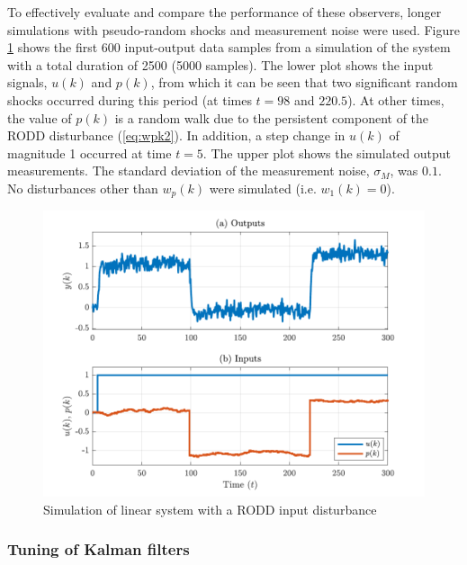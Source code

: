 To effectively evaluate and compare the performance of these observers, longer simulations with pseudo-random shocks and measurement noise were used. Figure \ref{fig:rod-obs-sim1-ioplot} shows the first 600 input-output data samples from a simulation of the system with a total duration of 2500 (5000 samples). The lower plot shows the input signals, $u(k)$ and $p(k)$, from which it can be seen that two significant random shocks occurred during this period (at times $t=98$ and $220.5$). At other times, the value of $p(k)$ is a random walk due to the persistent component of the \gls{RODD} disturbance (\ref{eq:wpk2}). In addition, a step change in $u(k)$ of magnitude 1 occurred at time $t=5$. The upper plot shows the simulated output measurements. The standard deviation of the measurement noise, $\sigma_M$, was $0.1$. No disturbances other than $w_p(k)$ were simulated (i.e. $w_1(k)=0$).
\begin{figure}[htp]
	\centering
	\includegraphics[width=13cm]{images/rod_obs_sim1_ioplot.pdf}
	\caption{Simulation of linear system with a \gls{RODD} input disturbance}
	\label{fig:rod-obs-sim1-ioplot}
\end{figure}

\subsubsection{Tuning of Kalman filters} \label{sim-obs-lin-1-KF-tuning}

